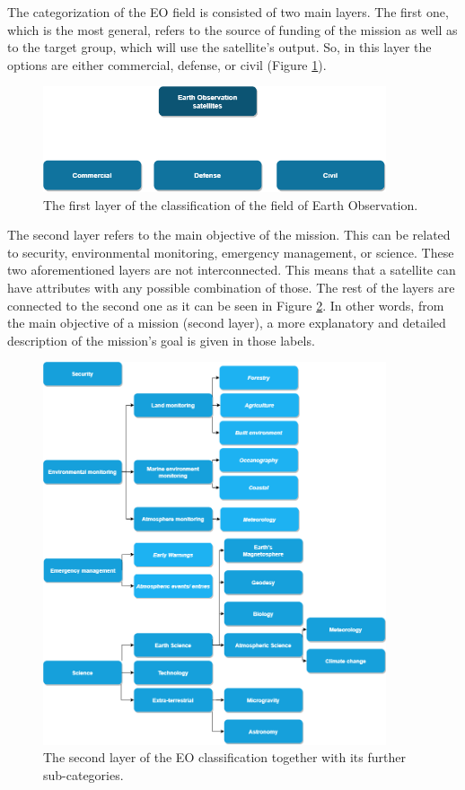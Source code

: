The categorization of the EO field is consisted of two main layers. The first one, which is the most general, refers to the source of funding of the mission as well as to the target group, which will use the satellite's output. So, in this layer the options are either commercial, defense, or civil (Figure \ref{classification_1st_layer}).

\begin{figure}
\centering
\includegraphics[width=0.9\textwidth]{Images/classification_1st_layer.png}\caption{The first layer of the classification of the field of Earth Observation.}
\label{classification_1st_layer}
\end{figure}

The second layer refers to the main objective of the mission. This can be related to security, environmental monitoring, emergency management, or science. These two aforementioned layers are not interconnected. This means that a satellite can have attributes with any possible combination of those. The rest of the layers are connected to the second one as it can be seen in Figure \ref{classification_2nd_layer}. In other words, from the main objective of a mission (second layer), a more explanatory and detailed description of the mission's goal is given in those labels.

\begin{figure}[!htb]
\centering
\includegraphics[width=0.9\textwidth]{Images/classification_2nd_layer.png}\caption{The second layer of the EO classification together with its further sub-categories.}
\label{classification_2nd_layer}
\end{figure}

